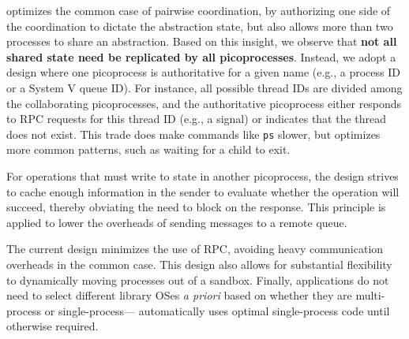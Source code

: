 \vspace{5pt}
\sysname{} optimizes the common case of pairwise coordination,
by authorizing one side of the coordination to dictate the abstraction state,
but also allows
more than two processes to share an abstraction.
Based on this insight, 
we observe that {\bf not all shared state need be replicated by all picoprocesses}.
Instead, we adopt a design where one picoprocess is authoritative for a given name (e.g., a process ID or a System V queue ID).
For instance, all possible thread IDs are divided among the collaborating picoprocesses,
and the authoritative picoprocess either responds to RPC requests for this thread ID (e.g., a signal)
or indicates that the thread does not exist.
This trade does make commands like {\tt ps} slower, 
but optimizes more common patterns, such as waiting for a child to exit.

\vspace{5pt}
For operations that must write to state in another picoprocess, 
the \sysname{} design strives to cache enough information in the sender 
to evaluate whether the operation will succeed, thereby obviating the 
need to block on the response.  This principle is applied to lower the overheads
of sending messages to a remote queue.




\vspace{5pt}
The current \sysname{} design minimizes the use of RPC,
avoiding heavy communication overheads in the common case.
This design also allows for substantial flexibility to dynamically moving processes out of
a sandbox.  Finally, applications do not need to select different 
library OSes {\em a priori} based on whether they are multi-process or single-process---\sysname{}
automatically uses optimal single-process code until otherwise required.
